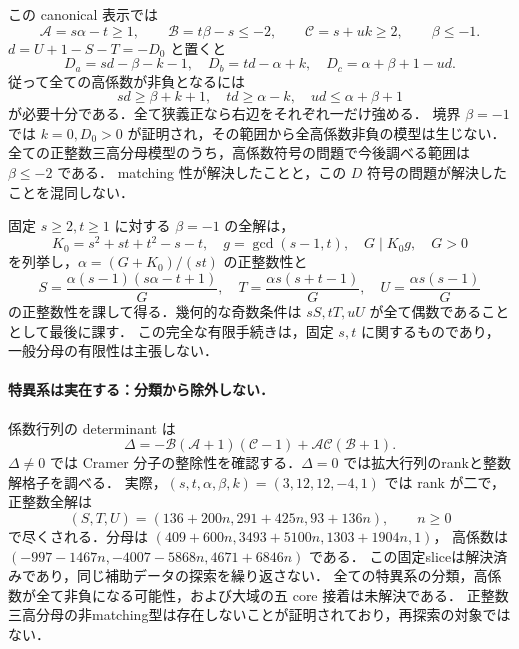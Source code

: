 この canonical 表示では
\[
 \mathcal A=s\alpha-t\geq1,\qquad
 \mathcal B=t\beta-s\leq-2,\qquad
 \mathcal C=s+uk\geq2,\qquad \beta\leq-1.
\]
$d=U+1-S-T=-D_0$ と置くと
\[
 D_a=sd-\beta-k-1,\quad D_b=td-\alpha+k,\quad
 D_c=\alpha+\beta+1-ud.
\]
従って全ての高係数が非負となるには
\[
 sd\geq\beta+k+1,\quad td\geq\alpha-k,\quad
 ud\leq\alpha+\beta+1
\]
が必要十分である．全て狭義正なら右辺をそれぞれ一だけ強める．
境界 $\beta=-1$ では $k=0,D_0>0$ が証明され，その範囲から全高係数非負の模型は生じない．
全ての正整数三高分母模型のうち，高係数符号の問題で今後調べる範囲は $\beta\leq-2$ である．
matching 性が解決したことと，この $D$ 符号の問題が解決したことを混同しない．

固定 $s\geq2,t\geq1$ に対する $\beta=-1$ の全解は，
\[
 K_0=s^2+st+t^2-s-t,\quad g=\gcd(s-1,t),\quad G\mid K_0g,\quad G>0
\]
を列挙し，$\alpha=(G+K_0)/(st)$ の正整数性と
\[
 S=\frac{\alpha(s-1)(s\alpha-t+1)}G,\quad
 T=\frac{\alpha s(s+t-1)}G,\quad
 U=\frac{\alpha s(s-1)}G
\]
の正整数性を課して得る．幾何的な奇数条件は $sS,tT,uU$ が全て偶数であることとして最後に課す．
この完全な有限手続きは，固定 $s,t$ に関するものであり，一般分母の有限性は主張しない．

\paragraph{特異系は実在する：分類から除外しない．}
係数行列の determinant は
\[
 \Delta=-\mathcal B(\mathcal A+1)(\mathcal C-1)
          +\mathcal A\mathcal C(\mathcal B+1).
\]
$\Delta\ne0$ では Cramer 分子の整除性を確認する．$\Delta=0$ では拡大行列のrankと整数解格子を調べる．
実際，$(s,t,\alpha,\beta,k)=(3,12,12,-4,1)$ では rank が二で，正整数全解は
\[
 (S,T,U)=(136+200n,291+425n,93+136n),\qquad n\geq0
\]
で尽くされる．分母は $(409+600n,3493+5100n,1303+1904n,1)$，
高係数は $(-997-1467n,-4007-5868n,4671+6846n)$ である．
この固定sliceは解決済みであり，同じ補助データの探索を繰り返さない．
全ての特異系の分類，高係数が全て非負になる可能性，および大域の五 core 接着は未解決である．
正整数三高分母の非matching型は存在しないことが証明されており，再探索の対象ではない．

